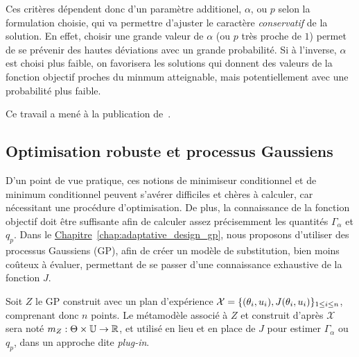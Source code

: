 \documentclass[../../Main_ManuscritThese.tex]{subfiles}
\newcommand{\frchap}[1]{\hyperref[#1]{Chapitre}~\ref{#1}}
\begin{document}
Ces critères dépendent donc d'un paramètre additionel, $\alpha$, ou
$p$ selon la formulation choisie, qui va permettre d'ajuster le
caractère \emph{conservatif} de la solution. En effet, choisir une
grande valeur de $\alpha$ (ou $p$ très proche de $1$) permet de se
prévenir des hautes déviations avec un grande probabilité. Si à
l'inverse, $\alpha$ est choisi plus faible, on favorisera les
solutions qui donnent des valeurs de la fonction objectif proches du
minmum atteignable, mais potentiellement avec une probabilité plus
faible.
  
Ce travail a mené à la publication de~\cite{trappler_robust_2020}.
  
\subsection*{Optimisation robuste et processus Gaussiens}
D'un point de vue pratique, ces notions de minimiseur conditionnel et
de minimum conditionnel peuvent s'avérer difficiles et chères à
calculer, car nécessitant une procédure d'optimisation. De plus, la
connaissance de la fonction objectif doit être suffisante afin de
calculer assez précisemment les quantités $\Gamma_{\alpha}$ et $q_p$.
Dans le \frchap{chap:adaptative_design_gp}, nous proposons d'utiliser
des processus Gaussiens (GP), afin de créer un modèle de substitution,
bien moins coûteux à évaluer, permettant de se passer d'une
connaissance exhaustive de la fonction $J$.

Soit $Z$ le GP construit avec un plan d'expérience
$\mathcal{X}=\{(\theta_i, u_i), J(\theta_i, u_i)\}_{1\leq i \leq n}$,
comprenant donc $n$ points.  Le métamodèle associé à $Z$ et construit
d'après $\mathcal{X}$ sera noté
$m_Z:\Theta\times \mathbb{U} \rightarrow \mathbb{R}$, et utilisé en lieu
et en place de $J$ pour estimer $\Gamma_{\alpha}$ ou $q_p$, dans un
approche dite \emph{plug-in}.
\end{document}
